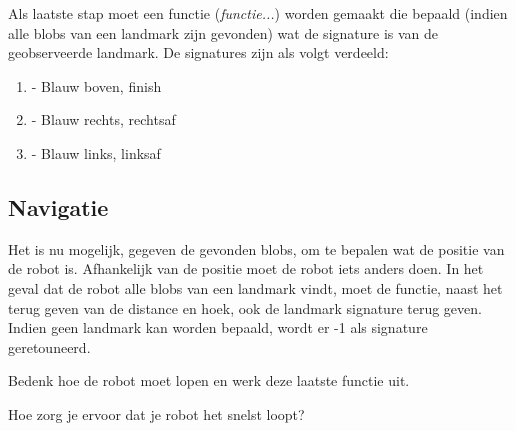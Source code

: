 \documentclass[a4paper]{article}
\begin{document}
Als laatste stap moet een functie (\textit{functie...}) worden gemaakt die bepaald (indien alle blobs van een landmark zijn gevonden) wat de signature is van de geobserveerde landmark. De signatures zijn als volgt verdeeld:

\begin{enumerate}
\item - Blauw boven, finish
\item - Blauw rechts, rechtsaf
\item - Blauw links, linksaf
\end{enumerate}

\subsection{Navigatie}

Het is nu mogelijk, gegeven de gevonden blobs, om te bepalen wat de positie van de robot is. Afhankelijk van de positie moet de robot iets anders doen. 
In het geval dat de robot alle blobs van een landmark vindt, moet de functie, naast het terug geven van de distance en hoek, ook de landmark signature terug geven. Indien geen landmark kan worden bepaald, wordt er -1 als signature geretouneerd. 

Bedenk hoe de robot moet lopen en werk deze laatste functie uit.

Hoe zorg je ervoor dat je robot het snelst loopt?
\end{document}
